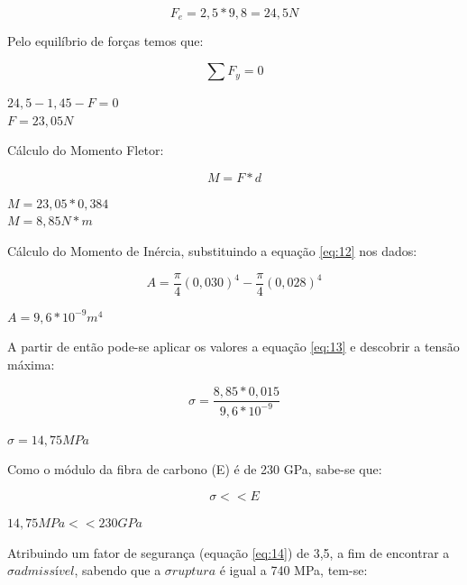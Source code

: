 \begin{equation}
 F_e =2,5 * 9,8=24,5 N
\end{equation}

Pelo equilíbrio de forças temos que:

\begin{equation}
 \sum {F_y} = 0
\end{equation}

\begin{center}
 $24,5 - 1,45 - F = 0$\\
 $F = 23,05N$
\end{center}

Cálculo do Momento Fletor:

  \begin{equation}
    M = F*d
  \end{equation}
  
  \begin{center}
   $M = 23,05 * 0,384$ \\
   $M = 8,85 N*m$
  \end{center}

Cálculo do Momento de Inércia, substituindo a equação \ref{eq:12} nos dados:

\begin{equation}
 A= \frac{\pi}{4}({0,030}) ^ {4} -  \frac{\pi}{4}({0,028}) ^ {4}
\end{equation}
% 
 \begin{center}
 $ A = 9,6 * {10} ^ {-9}   {m} ^ {4}$
\end{center}

A partir de então pode-se aplicar os valores a equação \ref{eq:13} e descobrir a tensão máxima:

\begin{equation}
 \sigma = \frac{8,85*0,015}{9,6 *{10} ^ {-9}}
\end{equation}

\begin{center}
 $\sigma = 14,75 MPa$
\end{center}

Como o módulo da fibra de carbono (E) é de 230 GPa, sabe-se que:

\begin{equation}
  \sigma << E 
\end{equation}

\begin{center}
 $14,75 MPa << 230 GPa$
\end{center}

Atribuindo um fator de segurança (equação \ref{eq:14}) de 3,5, a fim de encontrar a
$\sigma admissível$, sabendo que a $\sigma ruptura$ é igual a 740 MPa, tem-se:

